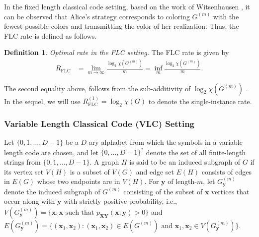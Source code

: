\documentclass[journal, onecolumn, draftcls]{IEEEtran}
\theoremstyle{definition}
\newtheorem{definition}{Definition}
\newcommand{\bfy}{\mathbf{y}}
\newcommand{\bfX}{\mathbf{X}}
\newcommand{\bfY}{\mathbf{Y}}
\newcommand{\bfx}{\mathbf{x}}
\newcommand{\meng}[1]{\marginpar{+}{\bf Ruoyu's remark}: {\em #1}}
\newcommand{\aditya}[1]{\marginpar{+}{\bf Aditya's remark}: {\em #1}}
\begin{document}
In the fixed length classical code setting, based on the work of Witsenhausen \cite{Witsenhausen_76}, it can be observed that Alice's strategy corresponds to coloring $G^{(m)}$ with the fewest possible colors and transmitting the color of her realization\cite{Witsenhausen_76}. Thus, the FLC rate is defined as follows. %
\begin{definition} 
\label{defn:witsenhausen_classical_rate} {\it Optimal rate in the FLC setting.} The FLC rate is given by 
\begin{align*}
    R_{\text{FLC}} &= \lim_{m \to \infty} \frac{\log_2 \chi(G^{(m)})}{m} = \inf_m  \frac{\log_2 \chi(G^{(m)})}{m}.
\end{align*}
\end{definition}
The second equality above, follows from the sub-additivity of $\log_2 \chi(G^{(m)})$ \cite{NayakTR06}. In the sequel, we will use $R_{\text{FLC}}^{(1)} = \log_2 \chi(G)$ to denote the single-instance rate. %


\subsubsection{\bf Variable Length Classical Code (VLC) Setting} \label{subsubsec:VLC_setting}




Let $\{0, 1, \dots, D-1\}$ be a $D$-ary alphabet from which the symbols in a variable length code are chosen, and let $ \{0,\dots, D-1\}^*$ denote the set of all finite-length strings from $\{0, 1, \dots, D-1\}$. A graph $H$  is said to be an induced subgraph of $G$ if its vertex set $V(H)$ is a subset of $V(G)$  and edge set $E(H)$ consists of edges in $E(G)$ whose two endpoints are in $V(H)$. For $\bfy$ of length-$m$, let $G^{(m)}_\bfy$ denote the induced subgraph of $G^{(m)}$ consisting of the subset of $\bfx$ vertices that occur along with $\bfy$ with strictly positive probability, i.e., $V(G^{(m)}_\bfy) = \{\bfx:\bfx\text{ such that }p_{\bfX\bfY}(\bfx,\bfy)>0\}$ and $E(G^{(m)}_\bfy) = \{(\bfx_1,\bfx_2):(\bfx_1,\bfx_2)\in E(G^{(m)})\text{ and }\bfx_1,\bfx_2\in V(G^{(m)}_\bfy)\}$. %
\end{document}
